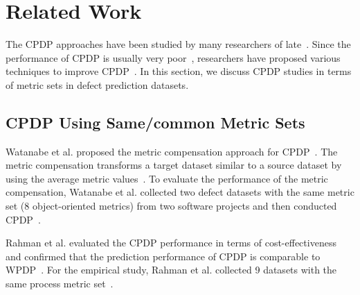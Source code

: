 \section{Related Work}
\label{sec:Background}
The CPDP approaches have been studied by many researchers
of late~\cite{Canfora13,Ma12,Nam13,Panichella14,Rahman12,Ryu14,Ryu15,Turhan09,Zhang15,Zimmermann09}. Since the performance
of CPDP is usually very poor~\cite{Zimmermann09}, researchers have proposed various techniques to
improve CPDP~\cite{Canfora13,Ma12,Nam13,Panichella14,Ryu14,Ryu15,Turhan09,Watanabe08}. In this section, we discuss CPDP studies in terms of metric sets in defect prediction datasets.

  
\subsection{CPDP Using Same/common Metric Sets}
Watanabe et al. proposed the metric compensation approach for
CPDP~\cite{Watanabe08}. The metric compensation transforms a target dataset
similar to a source dataset by using the average metric
values~\cite{Watanabe08}.
To evaluate the performance of the metric compensation, Watanabe et al. collected
two defect datasets with the same metric set (8 object-oriented
metrics) from two software projects and then conducted
CPDP~\cite{Watanabe08}.

Rahman et al. evaluated the CPDP performance in terms of
cost-effectiveness and confirmed that the prediction performance of CPDP is
comparable to WPDP~\cite{Rahman12}. For the empirical study, Rahman et al.
collected 9 datasets with the same process metric set~\cite{Rahman12}.

